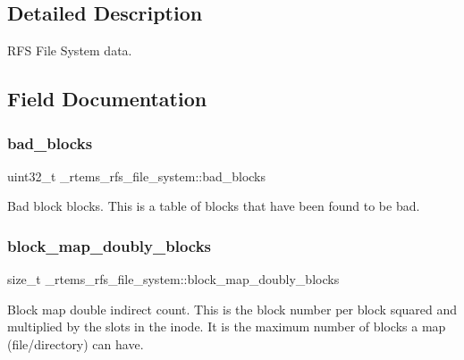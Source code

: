 \subsection{Detailed Description}
R\+FS File System data. 

\subsection{Field Documentation}
\mbox{\label{struct__rtems__rfs__file__system_a9dcba52af535467ff8b7b8879621fcea}} 
\subsubsection{\texorpdfstring{bad\_blocks}{bad\_blocks}}
{\footnotesize\ttfamily uint32\+\_\+t \+\_\+rtems\+\_\+rfs\+\_\+file\+\_\+system\+::bad\+\_\+blocks}

Bad block blocks. This is a table of blocks that have been found to be bad. \mbox{\label{struct__rtems__rfs__file__system_a3a1c5beceac06ccca468cda05645bdd9}} 
\subsubsection{\texorpdfstring{block\_map\_doubly\_blocks}{block\_map\_doubly\_blocks}}
{\footnotesize\ttfamily size\+\_\+t \+\_\+rtems\+\_\+rfs\+\_\+file\+\_\+system\+::block\+\_\+map\+\_\+doubly\+\_\+blocks}

Block map double indirect count. This is the block number per block squared and multiplied by the slots in the inode. It is the maximum number of blocks a map (file/directory) can have. \mbox{\label{struct__rtems__rfs__file__system_a4b071ec03b18f32a95b4c12efd8a1567}} 
